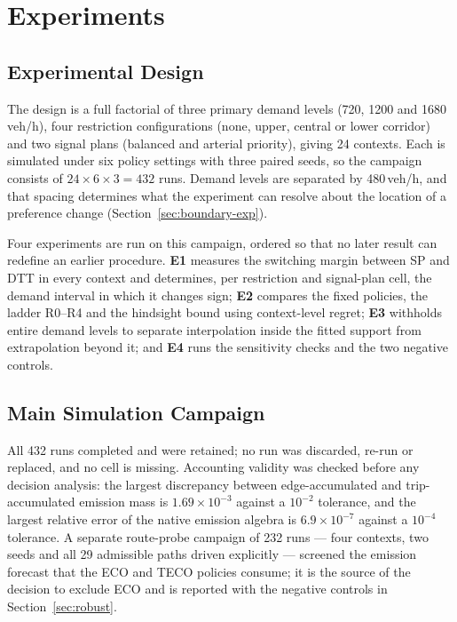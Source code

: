
\section{Experiments}

\subsection{Experimental Design}

The design is a full factorial of three primary demand levels (720, 1200 and
1680\,veh/h), four restriction configurations (none, upper, central or lower corridor)
and two signal plans (balanced and arterial priority), giving 24 contexts. Each is
simulated under six policy settings with three paired seeds, so the campaign consists of
$24\times6\times3=432$ runs. Demand levels are separated by 480\,veh/h, and that spacing
determines what the experiment can resolve about the location of a preference change
(Section~\ref{sec:boundary-exp}).

Four experiments are run on this campaign, ordered so that no later result can redefine an
earlier procedure. \textbf{E1} measures the switching margin between SP and DTT in every
context and determines, per restriction and signal-plan cell, the demand interval in which
it changes sign; \textbf{E2} compares the fixed policies, the ladder R0--R4 and the
hindsight bound using context-level regret; \textbf{E3} withholds entire demand levels to
separate interpolation inside the fitted support from extrapolation beyond it; and
\textbf{E4} runs the sensitivity checks and the two negative controls.

\subsection{Main Simulation Campaign}

All 432 runs completed and were retained; no run was discarded, re-run or replaced, and no
cell is missing. Accounting validity was checked before any decision analysis: the largest
discrepancy between edge-accumulated and trip-accumulated emission mass is
$1.69\times10^{-3}$ against a $10^{-2}$ tolerance, and the largest relative error of the
native emission algebra is $6.9\times10^{-7}$ against a $10^{-4}$ tolerance. A separate
route-probe campaign of 232 runs --- four contexts, two seeds and all 29 admissible paths
driven explicitly --- screened the emission forecast that the ECO and TECO policies
consume; it is the source of the decision to exclude ECO and is reported with the negative
controls in Section~\ref{sec:robust}.

